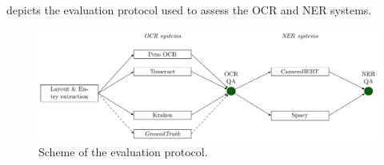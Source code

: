  depicts the evaluation protocol used to assess the OCR and NER systems. 

\begin{figure}[tb]
    \includegraphics[width=\linewidth]{figs/protocol.pdf}
    \caption{Scheme of the evaluation protocol. }
    \label{fig.protocol}
    \end{figure}



